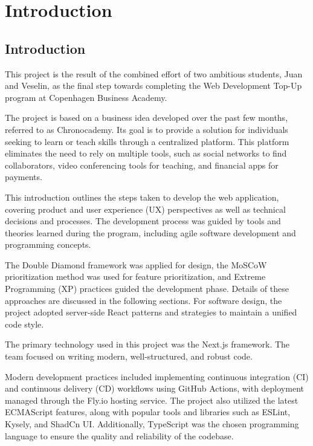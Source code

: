 \chapter{Introduction}\label{ch:introduction}

\section{Introduction}\label{sec:introduction}

This project is the result of the combined effort of two ambitious students, Juan and Veselin, as the final step towards completing the Web Development Top-Up program at Copenhagen Business Academy.

The project is based on a business idea developed over the past few months, referred to as Chronocademy.
Its goal is to provide a solution for individuals seeking to learn or teach skills through a centralized platform.
This platform eliminates the need to rely on multiple tools, such as social networks to find collaborators, video conferencing tools for teaching, and financial apps for payments.

This introduction outlines the steps taken to develop the web application, covering product and user experience (UX) perspectives as well as technical decisions and processes.
The development process was guided by tools and theories learned during the program, including agile software development and programming concepts.

The Double Diamond framework was applied for design, the MoSCoW prioritization method was used for feature prioritization, and Extreme Programming (XP) practices guided the development phase.
Details of these approaches are discussed in the following sections.
For software design, the project adopted server-side React patterns and strategies to maintain a unified code style.

The primary technology used in this project was the Next.js framework.
The team focused on writing modern, well-structured, and robust code.

Modern development practices included implementing continuous integration (CI) and continuous delivery (CD) workflows using GitHub Actions, with deployment managed through the Fly.io hosting service.
The project also utilized the latest ECMAScript features, along with popular tools and libraries such as ESLint, Kysely, and ShadCn UI. Additionally, TypeScript was the chosen programming language to ensure the quality and reliability of the codebase.

